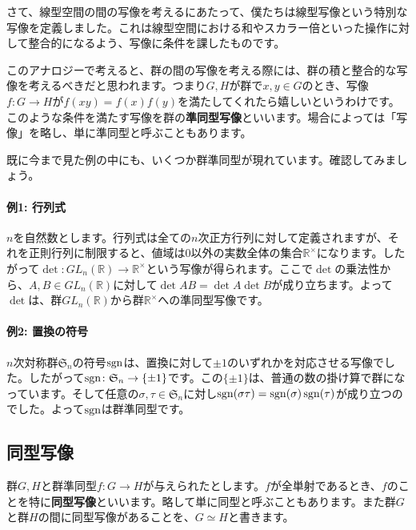さて、線型空間の間の写像を考えるにあたって、僕たちは線型写像という特別な写像を定義しました。これは線型空間における和やスカラー倍といった操作に対して整合的になるよう、写像に条件を課したものです。

このアナロジーで考えると、群の間の写像を考える際には、群の積と整合的な写像を考えるべきだと思われます。つまり$G, H$が群で$x, y \in G$のとき、写像$f\colon G \rightarrow H$が$f(xy) = f(x)f(y)$を満たしてくれたら嬉しいというわけです。このような条件を満たす写像を群の\textbf{準同型写像}といいます。場合によっては「写像」を略し、単に準同型と呼ぶこともあります。

既に今まで見た例の中にも、いくつか群準同型が現れています。確認してみましょう。

\paragraph{例1: 行列式}

$n$を自然数とします。行列式は全ての$n$次正方行列に対して定義されますが、それを正則行列に制限すると、値域は$0$以外の実数全体の集合$\mathbb{R}^{\times}$になります。したがって$\det \colon GL_n(\mathbb{R}) \rightarrow \mathbb{R}^{\times}$という写像が得られます。ここで$\det$の乗法性から、$A, B \in GL_n(\mathbb{R})$に対して$\det AB = \det A \det B$が成り立ちます。よって$\det$は、群$GL_n(\mathbb{R})$から群$\mathbb{R}^{\times}$への準同型写像です。

\paragraph{例2: 置換の符号}

$n$次対称群$\mathfrak{S}_n$の符号$\operatorname{sgn}$は、置換に対して$\pm1$のいずれかを対応させる写像でした。したがって$\operatorname{sgn} \colon \mathfrak{S}_n \rightarrow \{\pm1\}$です。この$\{\pm1\}$は、普通の数の掛け算で群になっています。そして任意の$\sigma, \tau \in \mathfrak{S}_n$に対し$\operatorname{sgn}(\sigma \tau) = \operatorname{sgn}(\sigma) \operatorname{sgn}(\tau)$が成り立つのでした。よって$\operatorname{sgn}$は群準同型です。

\subsection{同型写像}

群$G, H$と群準同型$f\colon G\rightarrow H$が与えられたとします。$f$が全単射であるとき、$f$のことを特に\textbf{同型写像}といいます。略して単に同型と呼ぶこともあります。また群$G$と群$H$の間に同型写像があることを、$G \simeq H$と書きます。

